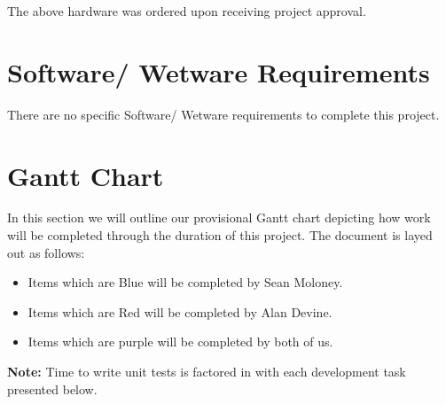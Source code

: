 \documentclass[12pt,a4paper,oneside]{book}
\theoremstyle{plain}
\numberwithin{equation}{chapter}
\newcounter{Secnum}
\begin{document}
\noindent The above hardware was ordered upon receiving project approval.

\section{Software/ Wetware Requirements}

\noindent There are no specific Software/ Wetware requirements to complete this project.

\section{Gantt Chart}

\noindent In this section we will outline our provisional Gantt chart depicting how work will be completed through the duration of this project. The document is layed out as follows:

\begin{itemize}
    \item Items which are Blue will be completed by Sean Moloney.
    \item Items which are Red will be completed by Alan Devine.
    \item Items which are purple will be completed by both of us.
\end{itemize}

\noindent \textbf{Note:} Time to write unit tests is factored in with each development task presented below.


\end{document}
